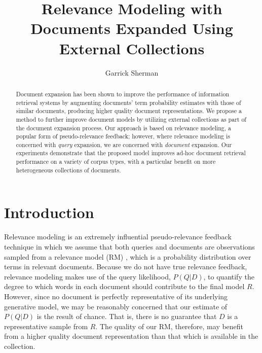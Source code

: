 \documentclass{sig-alternate}
\begin{document}
\author{Garrick Sherman}

\title{Relevance Modeling with Documents Expanded Using External Collections}

\maketitle
\begin{abstract}
Document expansion has been shown to improve the performance of information retrieval systems by augmenting documents' term probability estimates with those of similar documents, producing higher quality document representations. We propose a method to further improve document models by utilizing external collections as part of the document expansion process. Our approach is based on relevance modeling, a popular form of pseudo-relevance feedback; however, where relevance modeling is concerned with \textit{query} expansion, we are concerned with \textit{document} expansion. Our experiments demonstrate that the proposed model improves ad-hoc document retrieval performance on a variety of corpus types, with a particular benefit on more heterogeneous collections of documents.
\end{abstract}

\section{Introduction}\label{section.intro}


Relevance modeling is an extremely influential pseudo-relevance feedback technique in which we assume that both queries and documents are observations sampled from a relevance model (RM) \cite{Lavrenko2001}, which is a probability distribution over terms in relevant documents. Because we do not have true relevance feedback, relevance modeling makes use of the query likelihood, $P(Q|D)$, to quantify the degree to which words in each document should contribute to the final model $R$. However, since no document is perfectly representative of its underlying generative model, we may be reasonably concerned that our estimate of $P(Q|D)$ is the result of chance. That is, there is no guarantee that $D$ is a representative sample from $R$. The quality of our RM, therefore, may benefit from a higher quality document representation than that which is available in the collection.
\end{document}
